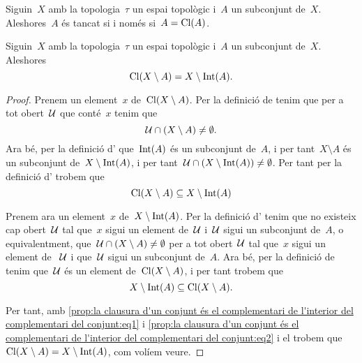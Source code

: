 \documentclass[../../main.tex]{subfiles}
\begin{document}
    \begin{corollary}
        \label{cor:un conjunt és tancat si i només si és igual a la seva clausura}
        Siguin~\(X\) amb la topologia~\(\tau\) un espai topològic i~\(A\) un subconjunt de~\(X\).
        Aleshores~\(A\) és tancat si i només si~\(A=\operatorname{Cl}(A)\).
    \end{corollary}
    \begin{proposition}
        \label{prop:la clausura d'un conjunt és el complementari de l'interior del complementari del conjunt}
        Siguin~\(X\) amb la topologia~\(\tau\) un espai topològic i~\(A\) un subconjunt de~\(X\).
        Aleshores
        \[
            \operatorname{Cl}(X\setminus A)=X\setminus\operatorname{Int}(A).
        \]
    \end{proposition}
    \begin{proof} %
        Prenem un element~\(x\) de~\(\operatorname{Cl}(X\setminus A)\).
        Per la definició de  tenim que per a tot obert~\(\mathcal{U}\) que conté~\(x\) tenim que
        \[
            \mathcal{U}\cap(X\setminus A)\neq\emptyset.
        \]
        Ara bé, per la definició d' que~\(\operatorname{Int}(A)\) és un subconjunt de~\(A\), i per tant~\(X\setminus A\) és un subconjunt de~\(X\setminus\operatorname{Int}(A)\), i per tant~\(\mathcal{U}\cap(X\setminus\operatorname{Int}(A))\neq\emptyset\).
        Per tant per la definició d' trobem que
        \begin{equation}
            \label{prop:la clausura d'un conjunt és el complementari de l'interior del complementari del conjunt:eq1}
            \operatorname{Cl}(X\setminus A)\subseteq X\setminus\operatorname{Int}(A)
        \end{equation}

        Prenem ara un element~\(x\) de~\(X\setminus\operatorname{Int}(A)\).
        Per la definició d' tenim que no existeix cap obert~\(\mathcal{U}\) tal que~\(x\) sigui un element de~\(\mathcal{U}\) i~\(\mathcal{U}\) sigui un subconjunt de~\(A\), o equivalentment, que~\(\mathcal{U}\cap(X\setminus A)\neq\emptyset\) per a tot obert~\(\mathcal{U}\) tal que~\(x\) sigui un element de ~\(\mathcal{U}\) i que~\(\mathcal{U}\) sigui un subconjunt de~\(A\).
        Ara bé, per la definició de  tenim que~\(\mathcal{U}\) és un element de~\(\operatorname{Cl}(X\setminus A)\), i per tant trobem que
        \begin{equation}
            \label{prop:la clausura d'un conjunt és el complementari de l'interior del complementari del conjunt:eq2}
            X\setminus\operatorname{Int}(A)\subseteq\operatorname{Cl}(X\setminus A).
        \end{equation}

        Per tant, amb \eqref{prop:la clausura d'un conjunt és el complementari de l'interior del complementari del conjunt:eq1} i \eqref{prop:la clausura d'un conjunt és el complementari de l'interior del complementari del conjunt:eq2} i el  trobem que~\(\operatorname{Cl}(X\setminus A)=X\setminus\operatorname{Int}(A)\), com volíem veure.
    \end{proof}
\end{document}
